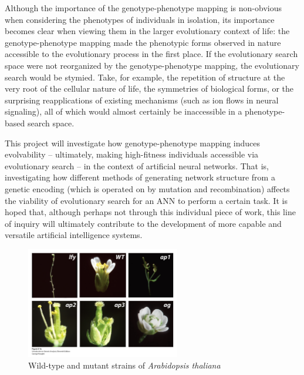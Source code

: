 Although the importance of the genotype-phenotype mapping is non-obvious when considering the phenotypes of individuals in isolation, its importance becomes clear when viewing them in the larger evolutionary context of life: the genotype-phenotype mapping made the phenotypic forms observed in nature accessible to the evolutionary process in the first place. If the evolutionary search space were not reorganized by the genotype-phenotype mapping, the evolutionary search would be stymied.  Take, for example, the repetition of structure at the very root of the cellular nature of life, the symmetries of biological forms, or the surprising  reapplications of existing mechanisms (such as ion flows in neural signaling), all of which would almost certainly be inaccessible in a phenotype-based search space.

This project will investigate how genotype-phenotype mapping induces evolvability -- ultimately, making high-fitness individuals accessible via evolutionary search -- in the context of artificial neural networks. That is, investigating how different methods of generating network structure from a genetic encoding (which is operated on by mutation and recombination) affects the viability of evolutionary search for an ANN to perform a certain task. It is hoped that, although perhaps not through this individual piece of work, this line of inquiry will ultimately contribute to the development of more capable and versatile artificial intelligence systems.

\begin{figure}
\centering
\includegraphics[width=0.6\textwidth]{img/arabidopsis_mutations.png}
\caption{\label{fig:arabidopsis_mutants}Wild-type and mutant strains of \textit{Arabidopsis thaliana} \cite{Griffiths2015IntroductionAnalysis}} 
\end{figure}